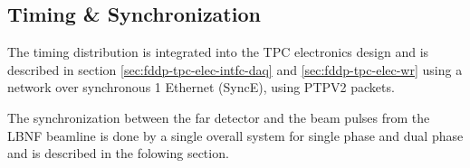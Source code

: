 \subsection{Timing \& Synchronization}
\label{sec:fd-daq-timing}


The timing distribution is integrated into the TPC electronics design
and is described in section \ref{sec:fddp-tpc-elec-intfc-daq} and
\ref{sec:fddp-tpc-elec-wr} using a  network over
synchronous \SI{1}{\Gbps} Ethernet (SyncE), using PTPV2 packets.

The synchronization between the far detector and the beam pulses from
the LBNF beamline is done by a single overall system for single phase
and dual phase and is described in the folowing section.
